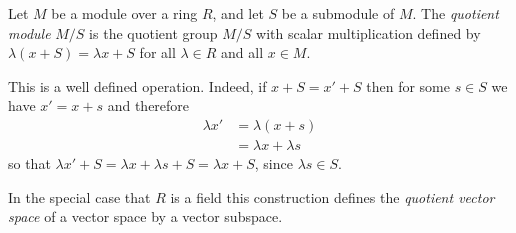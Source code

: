 \documentclass[12pt]{article}
\begin{document}
Let $M$ be a module over a ring $R$, and let $S$ be a submodule of $M$.
The \emph{quotient module} $M/S$ is the quotient group $M/S$ with
scalar multiplication defined by $\lambda(x+S)=\lambda x+S$ for all
$\lambda\in R$ and all $x\in M$.  

This is a well defined operation. Indeed, if $x+S = x'+S$ then for
some $s\in S$ we have $x'=x+s$ and therefore
\begin{align*}
  \lambda x' &= \lambda(x+s)\\
                &= \lambda x+\lambda s
\end{align*}
so that $\lambda x' + S = \lambda x + \lambda s + S = \lambda x + S$,
since $\lambda s \in S$. 

In the special case that $R$ is a field this construction defines
the \emph{quotient vector space} of a vector space by a vector subspace.
\end{document}
